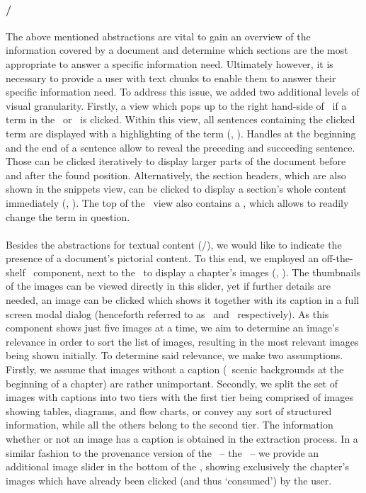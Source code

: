 \paragraph*{\Snippets /\Fulltext}
%
The above mentioned abstractions are vital to gain an overview of the information covered by a document and determine which sections are the most appropriate to answer a specific information need. 
%
Ultimately however, it is necessary to provide a user with text chunks to enable them to answer their specific information need. 
%
To address this issue, we added two additional levels of visual granularity.
%
Firstly, a \emph{\Snippets} view which pops up to the right hand-side of \toc\ if a term in the \wc\ or \hwc\ is clicked.
%
Within this view, all sentences containing the clicked term are displayed with a highlighting of the term (, \snps). 
%
Handles at the beginning and the end of a sentence allow to reveal the preceding and succeeding sentence. 
%
Those can be clicked iteratively to  display larger parts of the document before and after the found position. Alternatively, the section headers, which are also shown in the snippets view, can be clicked to display a section's whole content immediately (, \fullt).
%
The top of the \snps\ view also contains a \Searchbar, which allows to readily change the term in question.


\paragraph*{\ImageSlider}
%
Besides the abstractions for textual content (\wc/\hwc), we would like to indicate the presence of a document's pictorial content. 
%
To this end, we employed an off-the-shelf \is\ component, next to the \wc\ to display a chapter's images (, \is). 
%
The thumbnails of the images can be viewed directly in this slider, yet if further details are needed, an image can be clicked which shows it together with its caption in a full screen modal dialog (henceforth referred to as \isS\ and \isL\ respectively). 
%
As this component shows just five images at a time, we aim to determine an image's relevance in order to sort the list of images, resulting in the most relevant images being shown initially.
%
To determine said relevance, we make two assumptions. 
%
Firstly, we assume that images without a caption (\eg\ scenic backgrounds at the beginning of a chapter) are rather unimportant. 
%
Secondly, we split the set of images with captions into two tiers with the first tier being comprised of images showing tables, diagrams, and flow charts, or convey any sort of structured information, while all the others belong to the second tier.
%
The information whether or not an image has a caption is obtained in the extraction process. 
%
In a similar fashion to the provenance version of the \wc\ -- the \hwc\ -- we provide an additional image slider in the bottom of the \hwc, showing exclusively the chapter's images which have already been clicked (and thus `consumed') by the user.




